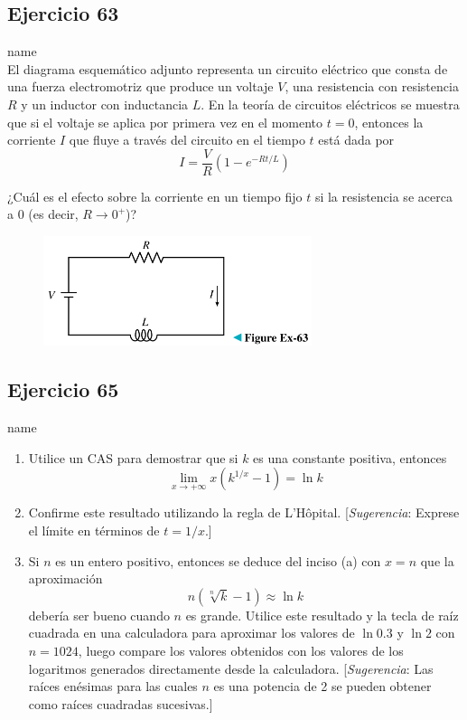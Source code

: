 \documentclass[12pt]{article}
\begin{document}
\subsection{Ejercicio 63} name \\

El diagrama esquemático adjunto representa un circuito eléctrico que consta de una fuerza electromotriz que produce un voltaje $V$, una resistencia con resistencia $R$ y un inductor con inductancia $L$. En la teoría de circuitos eléctricos se muestra que si el voltaje se aplica por primera vez en el momento $t = 0$, entonces la corriente $I$ que fluye a través del circuito en el tiempo $t$ está dada por
\[
I=\frac{V}{R}\left(1-e^{-Rt/L}\right)
\]

¿Cuál es el efecto sobre la corriente en un tiempo fijo $t$ si la resistencia se acerca a $0$ (es decir, $R\rightarrow 0^+$)?

\begin{figure}[H]
\centering
\includegraphics[width=0.7\textwidth]{../img/img_Lista3/circuit63.png}
\end{figure}

\subsection{Ejercicio 65} name \\

\begin{enumerate}[label=\alph*)]
\item Utilice un CAS para demostrar que si $k$ es una constante positiva, entonces
  \[
  \lim_{x \to +\infty} x(k^{1/x}-1)=\ln{k}
  \]
\item Confirme este resultado utilizando la regla de L'Hôpital. [\textit{Sugerencia}: Exprese el límite en términos de $t = 1/x$.]
\item Si $n$ es un entero positivo, entonces se deduce del inciso (a) con $x = n$ que la aproximación
  \[
  n(\sqrt[n]{k}-1)\approx \ln{k}
\]
debería ser bueno cuando $n$ es grande. Utilice este resultado y la tecla de raíz cuadrada en una calculadora para aproximar los valores de $\ln{0.3}$ y $\ln{2}$ con $n = 1024$, luego compare los valores obtenidos con los valores de los logaritmos generados directamente desde la calculadora. [\textit{Sugerencia}: Las raíces enésimas para las cuales $n$ es una potencia de 2 se pueden obtener como raíces cuadradas sucesivas.]
\end{enumerate}
\end{document}
